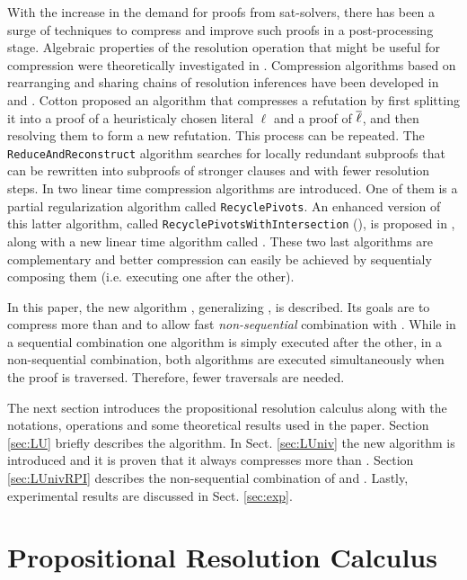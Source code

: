 \documentclass{llncs}
\begin{document}
With the increase in the demand for proofs from sat-solvers, there has been a surge of techniques to
compress and improve such proofs in a post-processing stage.  Algebraic properties of the resolution
operation that might be useful for compression were theoretically investigated in \cite{bwp10}.
Compression algorithms based on rearranging and sharing chains of resolution inferences have been
developed in \cite{Amjad07} and \cite{Sinz}.  Cotton \cite{CottonSplit} proposed an algorithm that
compresses a refutation by first splitting it into a proof of a heuristicaly chosen literal $\ell$
and a proof of $\overline{\ell}$, and then resolving them to form a new refutation. This process can be
repeated.  The \texttt{ReduceAndReconstruct} algorithm \cite{RedRec} searches for locally redundant
subproofs that can be rewritten into subproofs of stronger clauses and with fewer resolution steps.
In \cite{RP08} two linear time compression algorithms are introduced. One of them is a partial
regularization algorithm called \texttt{RecyclePivots}.  An enhanced version of this latter
algorithm, called \texttt{RecyclePivotsWithIntersection} ({\RPI}), is proposed in \cite{LURPI},
along with a new linear time algorithm called {\LowerUnits}.  These two last algorithms are
complementary and better compression can easily be achieved by sequentialy composing them (i.e.
executing one after the other).

In this paper, the new algorithm {\LowerUnivalents}, generalizing {\LowerUnits}, is described. Its
goals are to compress more than {\LowerUnits} and to allow fast \emph{non-sequential}  combination
with {\RPI}. While in a sequential combination one algorithm is simply executed after the other, in
a non-sequential combination, both algorithms are executed simultaneously when the proof is
traversed. Therefore, fewer traversals are needed.

The next section introduces the propositional resolution calculus along with the notations,
operations and some theoretical results used in the paper. Section \ref{sec:LU} briefly describes
the {\LowerUnits} algorithm. In Sect. \ref{sec:LUniv} the new algorithm {\LowerUnivalents} is
introduced and it is proven that it always compresses more than {\LowerUnits}. Section
\ref{sec:LUnivRPI} describes the non-sequential combination of {\LowerUnivalents} and {\RPI}.
Lastly, experimental results are discussed in Sect. \ref{sec:exp}.



\section{Propositional Resolution Calculus}
\end{document}
